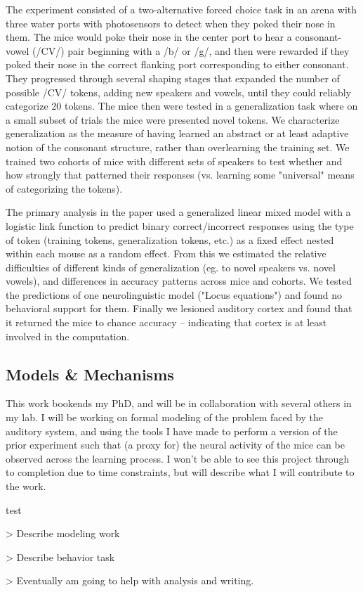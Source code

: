 \begin{done}
The experiment consisted of a two-alternative forced choice task in an arena with three water ports with photosensors to detect when they poked their nose in them. The mice would poke their nose in the center port to hear a consonant-vowel (/CV/) pair beginning with a /b/ or /g/, and then were rewarded if they poked their nose in the correct flanking port corresponding to either consonant. They progressed through several shaping stages that expanded the number of possible /CV/ tokens, adding new speakers and vowels, until they could reliably categorize 20 tokens. The mice then were tested in a generalization task where on a small subset of trials the mice were presented novel tokens. We characterize generalization as the measure of having learned an abstract or at least adaptive notion of the consonant structure, rather than overlearning the training set. We trained two cohorts of mice with different sets of speakers to test whether and how strongly that patterned their responses (vs. learning some "universal" means of categorizing the tokens).

The primary analysis in the paper used a generalized linear mixed model with a logistic link function to predict binary correct/incorrect responses using the type of token (training tokens, generalization tokens, etc.) as a fixed effect nested within each mouse as a random effect. From this we estimated the relative difficulties of different kinds of generalization (eg. to novel speakers vs. novel vowels), and differences in accuracy patterns across mice and cohorts. We tested the predictions of one neurolinguistic model ("Locus equations") and found no behavioral support for them. Finally we lesioned auditory cortex and found that it returned the mice to chance accuracy -- indicating that cortex is at least involved in the computation.
\end{done}

\subsection{Models \& Mechanisms}

This work bookends my PhD, and will be in collaboration with several others in my lab. I will be working on formal modeling of the problem faced by the auditory system, and using the tools I have made to perform a version of the prior experiment such that (a proxy for) the neural activity of the mice can be observed across the learning process. I won't be able to see this project through to completion due to time constraints, but will describe what I will contribute to the work.

\begin{todo}
test

> Describe modeling work

> Describe behavior task

> Eventually am going to help with analysis and writing.
\end{todo}

